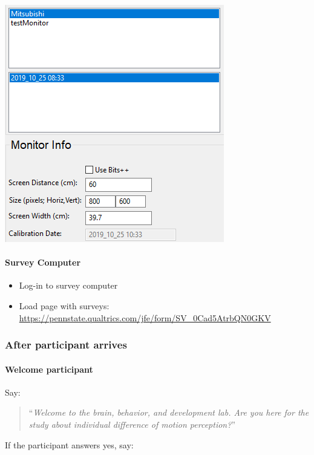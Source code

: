 \documentclass[]{article}
\providecommand{\tightlist}{%
  \setlength{\itemsep}{0pt}\setlength{\parskip}{0pt}}
\let\oldparagraph\paragraph
\renewcommand{\paragraph}[1]{\oldparagraph{#1}\mbox{}}
\begin{document}
\begin{itemize}
  \includegraphics{images/pp3.PNG}
\end{itemize}

\paragraph{Survey Computer}\label{survey-computer}

\begin{itemize}
\tightlist
\item
  Log-in to survey computer
\item
  Load page with surveys:
  \url{https://pennstate.qualtrics.com/jfe/form/SV_0Cad5AtrbQN0GKV}
\end{itemize}

\subsubsection{After participant
arrives}\label{after-participant-arrives}

\paragraph{Welcome participant}\label{welcome-participant}

Say:

\begin{quote}
``\emph{Welcome to the brain, behavior, and development lab. Are you
here for the study about individual difference of motion perception?}''
\end{quote}

If the participant answers yes, say:
\end{document}
